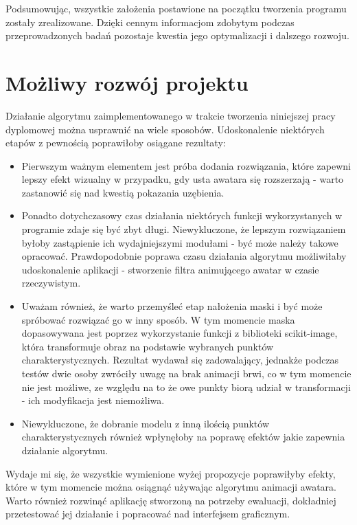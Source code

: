Podsumowując, wszystkie założenia postawione na początku tworzenia programu zostały zrealizowane. Dzięki cennym informacjom zdobytym podczas przeprowadzonych badań pozostaje kwestia jego optymalizacji i dalszego rozwoju.


\section{Możliwy rozwój projektu}
Działanie algorytmu zaimplementowanego w trakcie tworzenia niniejszej pracy dyplomowej można usprawnić na wiele sposobów. Udoskonalenie niektórych etapów z pewnością poprawiłoby osiągane rezultaty:
\begin{itemize}
    \item Pierwszym ważnym elementem jest próba dodania rozwiązania, które zapewni lepszy efekt wizualny w przypadku, gdy usta awatara się rozszerzają - warto zastanowić się nad kwestią pokazania uzębienia.
    \item Ponadto dotychczasowy czas działania niektórych funkcji wykorzystanych w programie zdaje się być zbyt długi. Niewykluczone, że lepszym rozwiązaniem byłoby zastąpienie ich wydajniejszymi modułami - być może należy takowe opracować. Prawdopodobnie poprawa czasu działania algorytmu możliwiłaby udoskonalenie aplikacji - stworzenie filtra animującego awatar w czasie rzeczywistym.
    \item Uważam również, że warto przemyśleć etap nałożenia maski i być może spróbować rozwiązać go w inny sposób. W tym momencie maska dopasowywana jest poprzez wykorzystanie funkcji z biblioteki scikit-image, która transformuje obraz na podstawie wybranych punktów charakterystycznych. Rezultat wydawał się zadowalający, jednakże podczas testów dwie osoby zwróciły uwagę na brak animacji brwi, co w tym momencie nie jest możliwe, ze względu na to że owe punkty biorą udział w transformacji - ich modyfikacja jest niemożliwa.
    \item Niewykluczone, że dobranie modelu z inną ilością punktów charakterystycznych również wpłynęłoby na poprawę efektów jakie zapewnia działanie algorytmu.
\end{itemize}

Wydaje mi się, że wszystkie wymienione wyżej propozycje poprawiłyby efekty, które w tym momencie można osiągnąć używając algorytmu animacji awatara. Warto również rozwinąć aplikację stworzoną na potrzeby ewaluacji, dokładniej przetestować jej działanie i popracować nad interfejsem graficznym.
